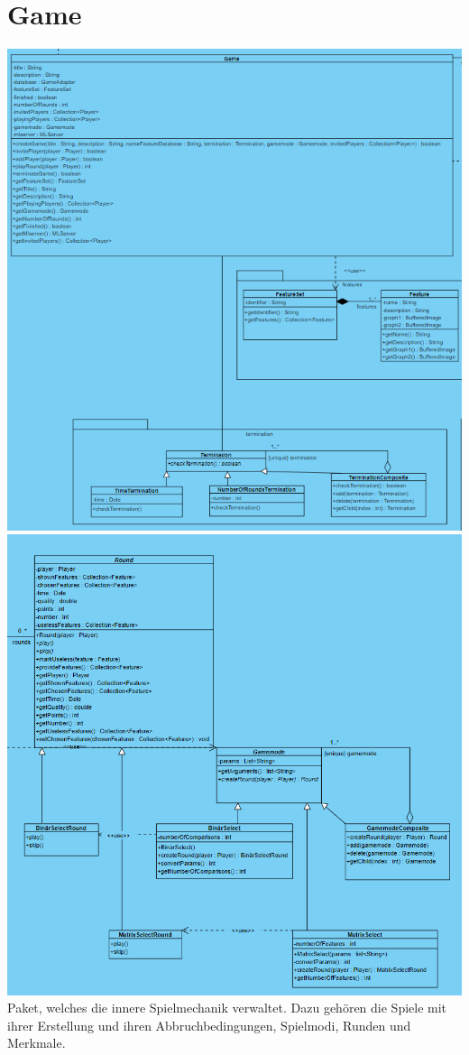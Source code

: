 \documentclass[a4paper]{scrreprt}
\begin{document}
	\section{Game}
	\includegraphics[width=\textwidth]{img/GameTerminationFeature.PNG}
	\includegraphics[width=\textwidth]{img/RoundAndGameMode.PNG}
	Paket, welches die innere Spielmechanik verwaltet. Dazu gehören die Spiele mit ihrer Erstellung und ihren Abbruchbedingungen, Spielmodi, Runden und Merkmale.
\end{document}

